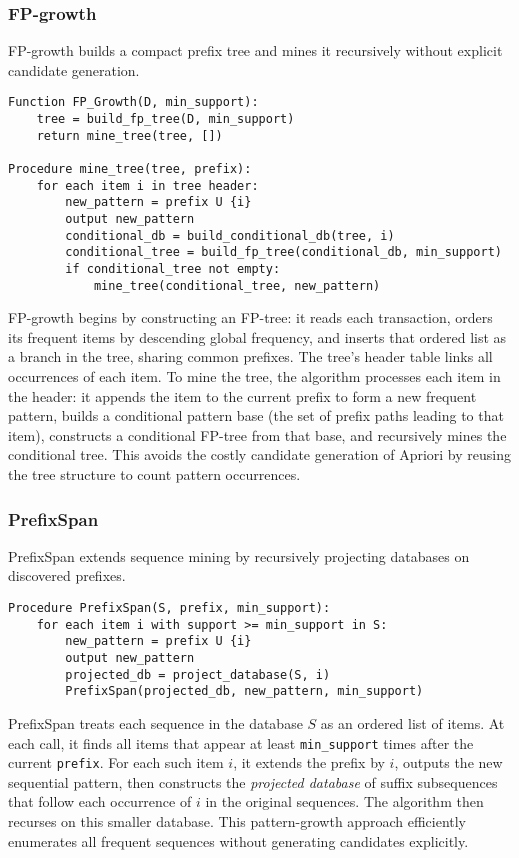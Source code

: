 \documentclass{article}
\begin{document}
\subsubsection{FP-growth}

FP-growth \cite{han2000mining} builds a compact prefix tree and mines it recursively without explicit candidate generation.

\begin{verbatim}
Function FP_Growth(D, min_support):
    tree = build_fp_tree(D, min_support)
    return mine_tree(tree, [])

Procedure mine_tree(tree, prefix):
    for each item i in tree header:
        new_pattern = prefix U {i}
        output new_pattern
        conditional_db = build_conditional_db(tree, i)
        conditional_tree = build_fp_tree(conditional_db, min_support)
        if conditional_tree not empty:
            mine_tree(conditional_tree, new_pattern)
\end{verbatim}

FP-growth begins by constructing an FP-tree: it reads each transaction, orders its frequent items by descending global frequency, and inserts that ordered list as a branch in the tree, sharing common prefixes.  The tree's header table links all occurrences of each item.  To mine the tree, the algorithm processes each item in the header: it appends the item to the current prefix to form a new frequent pattern, builds a conditional pattern base (the set of prefix paths leading to that item), constructs a conditional FP-tree from that base, and recursively mines the conditional tree.  This avoids the costly candidate generation of Apriori by reusing the tree structure to count pattern occurrences.

\subsubsection{PrefixSpan}

PrefixSpan \cite{pei2001prefixspan} extends sequence mining by recursively projecting databases on discovered prefixes.

\begin{verbatim}
Procedure PrefixSpan(S, prefix, min_support):
    for each item i with support >= min_support in S:
        new_pattern = prefix U {i}
        output new_pattern
        projected_db = project_database(S, i)
        PrefixSpan(projected_db, new_pattern, min_support)
\end{verbatim}

PrefixSpan treats each sequence in the database \(S\) as an ordered list of items.  At each call, it finds all items that appear at least \texttt{min\_support} times after the current \texttt{prefix}.  For each such item \(i\), it extends the prefix by \(i\), outputs the new sequential pattern, then constructs the \emph{projected database} of suffix subsequences that follow each occurrence of \(i\) in the original sequences.  The algorithm then recurses on this smaller database.  This pattern-growth approach efficiently enumerates all frequent sequences without generating candidates explicitly.
\end{document}
